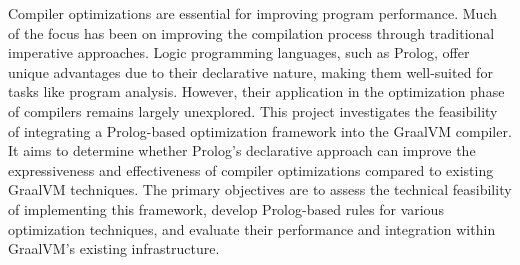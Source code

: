 Compiler optimizations are essential for improving program performance. 
Much of the focus has been on improving the compilation process through traditional imperative approaches. 
Logic programming languages, such as Prolog, offer unique advantages due to their declarative nature, making them well-suited for tasks like program analysis. 
However, their application in the optimization phase of compilers remains largely unexplored. 
This project investigates the feasibility of integrating a Prolog-based optimization framework into the GraalVM compiler. 
It aims to determine whether Prolog’s declarative approach can improve the expressiveness and effectiveness of compiler optimizations compared to existing GraalVM techniques.
The primary objectives are to assess the technical feasibility of implementing this framework, develop Prolog-based rules for various optimization techniques, and evaluate their performance and integration within GraalVM's existing infrastructure. 